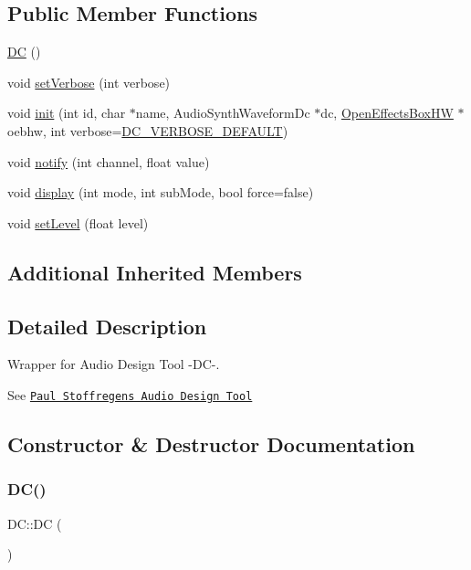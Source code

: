 \subsection*{Public Member Functions}
\begin{DoxyCompactItemize}
\item 
\mbox{\hyperlink{class_d_c_a921648df43516afc9b7ffa044ce6f4a8}{DC}} ()
\item 
void \mbox{\hyperlink{class_d_c_a1fb27467a4ab9013b6b01fb6295ada42}{set\+Verbose}} (int verbose)
\item 
void \mbox{\hyperlink{class_d_c_a767b3f22587703e7f59020d44872f432}{init}} (int id, char $\ast$name, Audio\+Synth\+Waveform\+Dc $\ast$dc, \mbox{\hyperlink{class_open_effects_box_h_w}{Open\+Effects\+Box\+HW}} $\ast$oebhw, int verbose=\mbox{\hyperlink{_d_c_8h_a41fb888bc7c99c6ae3c43304971faeb6}{D\+C\+\_\+\+V\+E\+R\+B\+O\+S\+E\+\_\+\+D\+E\+F\+A\+U\+LT}})
\item 
void \mbox{\hyperlink{class_d_c_a45e51132fbd69668134f3ab13f3668b1}{notify}} (int channel, float value)
\item 
void \mbox{\hyperlink{class_d_c_a006f266e63bdff5042fa2c443e1a04cc}{display}} (int mode, int sub\+Mode, bool force=false)
\item 
void \mbox{\hyperlink{class_d_c_aa7f1c23c91d43443c018cc48ab6db5ef}{set\+Level}} (float level)
\end{DoxyCompactItemize}
\subsection*{Additional Inherited Members}


\subsection{Detailed Description}
Wrapper for Audio Design Tool -\/\+D\+C-\/. 

See \href{https://www.pjrc.com/teensy/gui/}{\tt Paul Stoffregen\textquotesingle{}s Audio Design Tool} 

\subsection{Constructor \& Destructor Documentation}
\mbox{\label{class_d_c_a921648df43516afc9b7ffa044ce6f4a8}} 
\subsubsection{\texorpdfstring{D\+C()}{DC()}}
{\footnotesize\ttfamily D\+C\+::\+DC (\begin{DoxyParamCaption}{ }\end{DoxyParamCaption})}



